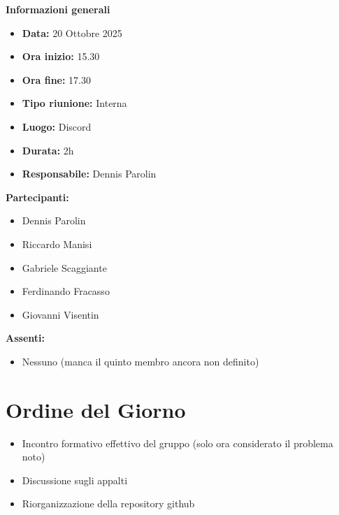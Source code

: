 \documentclass[a4paper,12pt]{article}
\begin{document}
\clearpage
{\large \textbf{Informazioni generali}}
{\footnotesize
{}

\begin{itemize}
    \item \textbf{Data:} 20 Ottobre 2025
    \item \textbf{Ora inizio:} 15.30
    \item \textbf{Ora fine:} 17.30
    \item \textbf{Tipo riunione:} Interna
    \item \textbf{Luogo:} Discord
    \item \textbf{Durata:} 2h
    \item \textbf{Responsabile:} Dennis Parolin
\end{itemize}

\vspace{0.2cm}

\textbf{Partecipanti:}
\begin{itemize}
    \item Dennis Parolin
    \item Riccardo Manisi
    \item Gabriele Scaggiante
    \item Ferdinando Fracasso
    \item Giovanni Visentin
\end{itemize}

\textbf{Assenti:}
\begin{itemize}
    \item Nessuno (manca il quinto membro ancora non definito)
\end{itemize}
}

\vspace{0.5cm}

\vspace{0.8cm}

\clearpage
\tableofcontents
\thispagestyle{empty} %
\clearpage

\section{Ordine del Giorno}
\begin{itemize}
    \item Incontro formativo effettivo del gruppo (solo ora considerato il problema noto)
    \item Discussione sugli appalti
    \item Riorganizzazione della repository github
\end{itemize}
\end{document}
